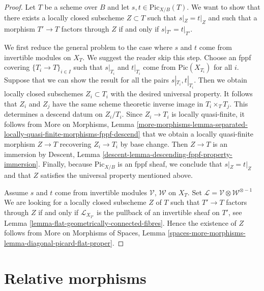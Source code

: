 \begin{proof}
Let $T$ be a scheme over $B$ and let $s, t \in \text{Pic}_{X/B}(T)$.
We want to show that there exists a locally closed subscheme $Z \subset T$
such that $s|_Z = t|_Z$ and such that a morphism $T' \to T$ factors
through $Z$ if and only if $s|_{T'} = t|_{T'}$.

\medskip\noindent
We first reduce the general problem to the case where $s$ and $t$ come
from invertible modules on $X_T$. We suggest the reader skip this step.
Choose an fppf covering $\{T_i \to T\}_{i \in I}$ such that
$s|_{T_i}$ and $t|_{T_i}$ come from $\text{Pic}(X_{T_i})$ for all $i$.
Suppose that we can show the result for all the pairs
$s|_{T_i}, t|_{T_i}$. Then we obtain locally closed subschemes
$Z_i \subset T_i$ with the desired universal property.
It follows that $Z_i$ and $Z_j$ have the same scheme theoretic
inverse image in $T_i \times_T T_j$.
This determines a descend datum on $Z_i/T_i$.
Since $Z_i \to T_i$ is locally quasi-finite, it follows from
More on Morphisms, Lemma
\ref{more-morphisms-lemma-separated-locally-quasi-finite-morphisms-fppf-descend}
that we obtain a locally quasi-finite morphism $Z \to T$
recovering $Z_i \to T_i$ by base change. Then $Z \to T$ is an immersion
by Descent, Lemma \ref{descent-lemma-descending-fppf-property-immersion}.
Finally, because $\text{Pic}_{X/B}$ is an fppf sheaf, we conclude
that $s|_Z = t|_Z$ and that $Z$ satisfies the universal property
mentioned above.

\medskip\noindent
Assume $s$ and $t$ come from invertible modules $\mathcal{V}$, $\mathcal{W}$
on $X_T$.
Set $\mathcal{L} = \mathcal{V} \otimes \mathcal{W}^{\otimes -1}$
We are looking for a locally closed subscheme $Z$ of $T$
such that $T' \to T$ factors through $Z$ if and only if $\mathcal{L}_{X_{T'}}$
is the pullback of an invertible sheaf on $T'$, see
Lemma \ref{lemma-flat-geometrically-connected-fibres}.
Hence the existence of $Z$ follows from
More on Morphisms of Spaces, Lemma
\ref{spaces-more-morphisms-lemma-diagonal-picard-flat-proper}.
\end{proof}











\section{Relative morphisms}
\label{section-relative-morphisms}


